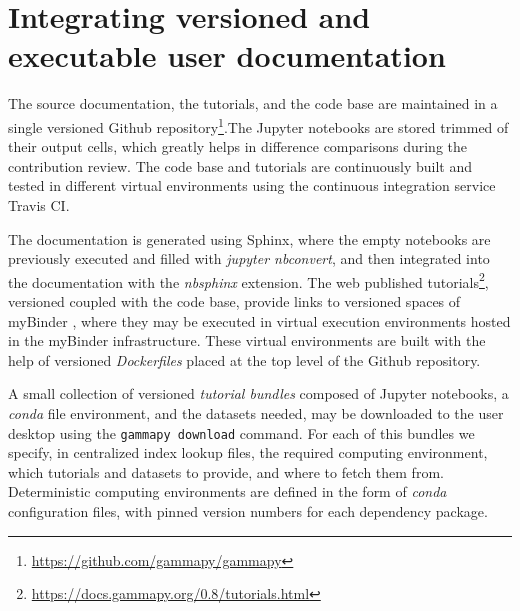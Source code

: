 \documentclass[11pt,twoside]{article}
\begin{document}
\section{Integrating versioned and executable user documentation}

The source documentation, the tutorials, and the code base are maintained in a single versioned Github repository\footnote{\url{https://github.com/gammapy/gammapy}}.The Jupyter  notebooks are stored trimmed of their output cells, which greatly helps in difference comparisons during the contribution review. The code base and tutorials are continuously built and tested in different virtual environments using the continuous integration service Travis CI.

The documentation is generated using Sphinx, where the empty notebooks are previously executed and filled with \textit{jupyter nbconvert}, and then integrated into the documentation with the \textit{nbsphinx} extension. The web published tutorials\footnote{\url{https://docs.gammapy.org/0.8/tutorials.html}}, versioned coupled with the code base, provide links to versioned spaces of myBinder \citep{project_jupyter-proc-scipy-2018}, where they may be executed in virtual execution environments hosted in the myBinder infrastructure. These virtual environments are built with the help of versioned \textit{Dockerfiles} placed at the top level of the Github repository. 

A small collection of versioned \textit{tutorial bundles} composed of Jupyter notebooks, a \textit{conda} file environment, and the datasets needed, may be downloaded to the user desktop using the {\tt gammapy download} command. For each of this bundles we specify, in centralized index lookup files, the required computing environment, which tutorials and datasets to provide, and where to fetch them from. Deterministic computing environments are defined in the form of \textit{conda} configuration files, with pinned version numbers for each dependency package. 

\end{document}

